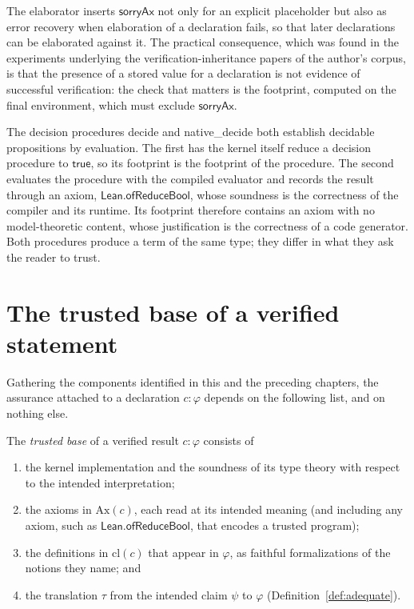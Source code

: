 The elaborator inserts $\mathsf{sorryAx}$ not only for an explicit placeholder but also as error recovery when elaboration of a declaration fails, so that later declarations can be elaborated against it. The practical consequence, which was found in the experiments underlying the verification-inheritance papers of the author's corpus, is that the presence of a stored value for a declaration is not evidence of successful verification: the check that matters is the footprint, computed on the final environment, which must exclude $\mathsf{sorryAx}$.

\begin{example}
\label{ex:native}
The decision procedures \textsf{decide} and \textsf{native\_decide} both establish decidable propositions by evaluation. The first has the kernel itself reduce a decision procedure to $\mathsf{true}$, so its footprint is the footprint of the procedure. The second evaluates the procedure with the compiled evaluator and records the result through an axiom, $\mathsf{Lean.ofReduceBool}$, whose soundness is the correctness of the compiler and its runtime. Its footprint therefore contains an axiom with no model-theoretic content, whose justification is the correctness of a code generator. Both procedures produce a term of the same type; they differ in what they ask the reader to trust.
\end{example}

\section{The trusted base of a verified statement}
\label{sec:tcb}

Gathering the components identified in this and the preceding chapters, the assurance attached to a declaration $c:\varphi$ depends on the following list, and on nothing else.

\begin{definition}
\label{def:tcb}
The \emph{trusted base} of a verified result $c:\varphi$ consists of
\begin{enumerate}[label=(T\arabic*),nosep]
\item the kernel implementation and the soundness of its type theory with respect to the intended interpretation;
\item the axioms in $\mathrm{Ax}(c)$, each read at its intended meaning (and including any axiom, such as $\mathsf{Lean.ofReduceBool}$, that encodes a trusted program);
\item the definitions in $\mathrm{cl}(c)$ that appear in $\varphi$, as faithful formalizations of the notions they name; and
\item the translation $\tau$ from the intended claim $\psi$ to $\varphi$ (Definition~\ref{def:adequate}).
\end{enumerate}
\end{definition}

